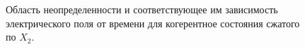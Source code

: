 \begin{figure}
\centering



\caption{Область неопределенности и соответствующее им зависимость
  электрического поля от времени для когерентное состояния сжатого по
  $X_2$.}
\label{figPart3Squeezed_3}
\end{figure}
